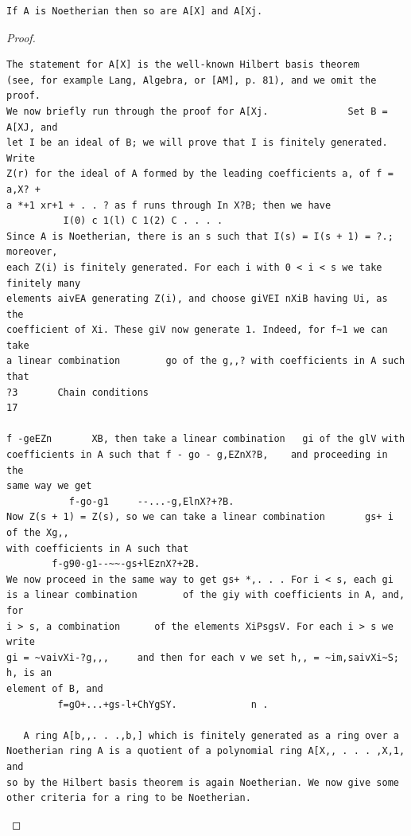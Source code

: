 \begin{theorem}\label{mcrt-auto-theorem-3-3}\uses{}
\begin{verbatim}
If A is Noetherian then so are A[X] and A[Xj.
\end{verbatim}
\end{theorem}
\begin{proof}
\begin{verbatim}
The statement for A[X] is the well-known Hilbert basis theorem
(see, for example Lang, Algebra, or [AM], p. 81), and we omit the proof.
We now briefly run through the proof for A[Xj.              Set B = A[XJ, and
let I be an ideal of B; we will prove that I is finitely generated. Write
Z(r) for the ideal of A formed by the leading coefficients a, of f = a,X? +
a *+1 xr+1 + . . ? as f runs through In X?B; then we have
          I(0) c 1(l) C 1(2) C . . . .
Since A is Noetherian, there is an s such that I(s) = I(s + 1) = ?.; moreover,
each Z(i) is finitely generated. For each i with 0 < i < s we take finitely many
elements aivEA generating Z(i), and choose giVEI nXiB having Ui, as the
coefficient of Xi. These giV now generate 1. Indeed, for f~1 we can take
a linear combination        go of the g,,? with coefficients in A such that
?3       Chain conditions                                                      17

f -geEZn       XB, then take a linear combination   gi of the glV with
coefficients in A such that f - go - g,EZnX?B,    and proceeding in the
same way we get
           f-go-g1     --...-g,ElnX?+?B.
Now Z(s + 1) = Z(s), so we can take a linear combination       gs+ i of the Xg,,
with coefficients in A such that
        f-g90-g1--~~-gs+lEznX?+2B.
We now proceed in the same way to get gs+ *,. . . For i < s, each gi
is a linear combination        of the giy with coefficients in A, and, for
i > s, a combination      of the elements XiPsgsV. For each i > s we write
gi = ~vaivXi-?g,,,     and then for each v we set h,, = ~im,saivXi~S; h, is an
element of B, and
         f=gO+...+gs-l+ChYgSY.             n .

   A ring A[b,,. . .,b,] which is finitely generated as a ring over a
Noetherian ring A is a quotient of a polynomial ring A[X,, . . . ,X,1, and
so by the Hilbert basis theorem is again Noetherian. We now give some
other criteria for a ring to be Noetherian.
\end{verbatim}
\end{proof}



